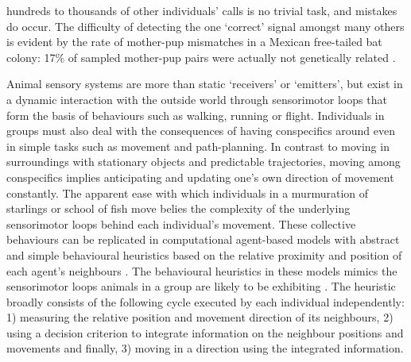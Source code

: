 \documentclass[
]{book}
\begin{document}
hundreds to thousands of other individuals' calls is no trivial task, and mistakes do occur. The difficulty of detecting the one `correct' signal amongst many others is evident by the rate of mother-pup mismatches in a Mexican free-tailed bat colony: 17\% of sampled mother-pup pairs were actually not genetically related \citep{mccracken1984communal} .

Animal sensory systems are more than static `receivers' or `emitters', but exist in a dynamic interaction with the outside world through sensorimotor loops that form the basis of behaviours such as walking, running or flight. Individuals in groups must also deal with the consequences of having conspecifics around even in simple tasks such as movement and path-planning. In contrast to moving in surroundings with stationary objects and predictable trajectories, moving among conspecifics implies anticipating and updating one's own direction of movement constantly. The apparent ease with which individuals in a murmuration of starlings or school of fish move belies the complexity of the underlying sensorimotor loops behind each individual's movement. These collective behaviours can be replicated in computational agent-based models with abstract and simple behavioural heuristics based on the relative proximity and position of each agent's neighbours \citep{reynolds1987a, couzin2002a}. The behavioural heuristics in these models mimics the sensorimotor loops animals in a group are likely to be exhibiting \citep{herbert2016understanding}. The heuristic broadly consists of the following cycle executed by each individual independently: 1) measuring the relative position and movement direction of its neighbours, 2) using a decision criterion to integrate information on the neighbour positions and movements and finally, 3) moving in a direction using the integrated information.
\end{document}
